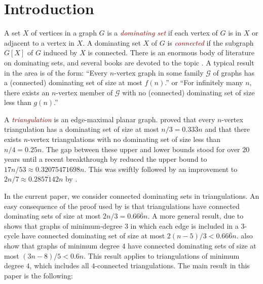 \documentclass[12pt]{article}
\newcommand{\defin}[1]{\emph{\textcolor{Maroon}{#1}}}
\theoremstyle{definition}
\newcommand{\pat}[1]{[\textcolor{red}{PM: #1}]}
\begin{document}

\section{Introduction}

A set $X$ of vertices in a graph $G$ is a \defin{dominating set} if each vertex of $G$ is in $X$ or adjacent to a vertex in $X$.  A dominating set $X$ of $G$ is \defin{connected} if the subgraph $G[X]$ of $G$ induced by $X$ is connected.  There is an enormous body of literature on dominating sets, and several books are devoted to the topic \cite{haynes.hedetniemi.ea:domination,haynes.hedetniemi.ea:topics}.  A typical result in the area is of the form: ``Every $n$-vertex graph in some family $\mathcal{G}$ of graphs has a (connected) dominating set of size at most $f(n)$.'' or ``For infinitely many $n$, there exists an $n$-vertex member of $\mathcal{G}$ with no (connected) dominating set of size less than $g(n)$.''

A \defin{triangulation} is an edge-maximal planar graph.  \citet{matheson.tarjan:dominating} proved that every $n$-vertex triangulation has a dominating set of size at most $n/3=0.33\overline{3}n$ and that there exists $n$-vertex triangulations with no dominating set of size less than $n/4=0.25n$. The gap between these upper and lower bounds stood for over $20$ years until a recent breakthrough by \citet{spacapan:domination} reduced the upper bound to $17n/53\approx 0.32075471698n$.  This was swiftly followed by an improvement to $2n/7\approx 0.2\overline{857142}n$ by \citet{christiansen.rotenberg.ea:triangulations}.

In the current paper, we consider connected dominating sets in triangulations.  An easy consequence of the proof used by \citet{matheson.tarjan:dominating} is that triangulations have connected dominating sets of size at most $2n/3=0.66\overline{6}n$.  A more general result, due to  \citet{kleitman.west:spanning} shows that graphs of minimum-degree $3$ in which each edge is included in a $3$-cycle have connected dominating set of size at most $2(n-5)/3<0.66\overline{6}n$.  \citet{kleitman.west:spanning} also show that graphs of minimum degree $4$ have connected dominating sets of size at most $(3n-8)/5<0.6n$. This result applies to triangulations of minimum degree $4$, which includes all $4$-connected triangulations.  The main result in this paper is the following:
\end{document}
